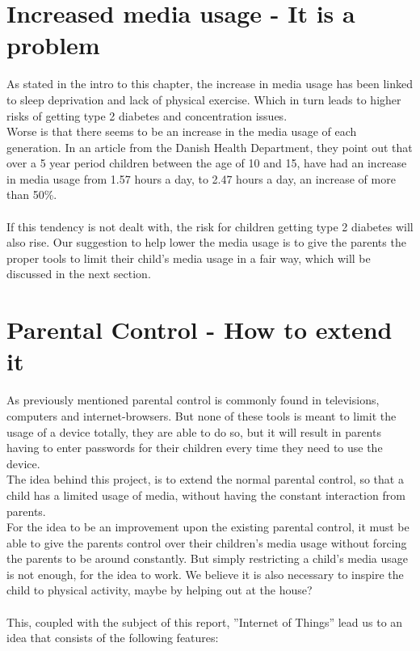 \section{Increased media usage - It is a problem}
As stated in the intro to this chapter, the increase in media usage has been linked to sleep deprivation and lack of physical exercise. Which in turn leads to higher risks of getting type 2 diabetes and concentration issues.\\
Worse is that there seems to be an increase in the media usage of each generation. In an article from the Danish Health Department, they point out that over a 5 year period children between the age of 10 and 15, have had an increase in media usage from 1.57 hours a day, to 2.47 hours a day, an increase of more than 50\%.\citep{sundhedsstyrelsen}\\
\\
If this tendency is not dealt with, the risk for children getting type 2 diabetes will also rise. Our suggestion to help lower the media usage is to give the parents the proper tools to limit their child’s media usage in a fair way, which will be discussed in the next section.


\section{Parental Control - How to extend it}
As previously mentioned parental control is commonly found in televisions, computers and internet-browsers. But none of these tools is meant to limit the usage of a device totally, they are able to do so, but it will result in parents having to enter passwords for their children every time they need to use the device.\\
The idea behind this project, is to extend the normal parental control, so that a child has a limited usage of media, without having the constant interaction from parents. \\
For the idea to be an improvement upon the existing parental control, it must be able to give the parents control over their children's media usage without forcing the parents to be around constantly. But simply restricting a child's media usage is not enough, for the idea to work. We believe it is also necessary to inspire the child to physical activity, maybe by helping out at the house?\\
\\
This, coupled with the subject of this report, ''Internet of Things'' lead us to an idea that consists of the following features:


